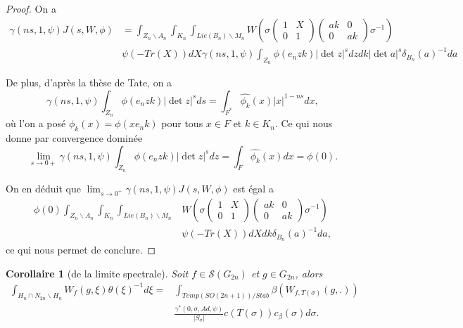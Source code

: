 \documentclass{amsart}
\newtheorem{corollaire}{Corollaire}[section]
\begin{document}
\begin{proof}
On a
\begin{equation}
\begin{split}
\gamma(ns, 1, \psi) J(s, W, \phi) &= \int_{Z_n \backslash A_n} \int_{K_n} \int_{Lie(B_n) \backslash M_n} W\left(\sigma\begin{pmatrix}
1 & X \\
0 & 1
\end{pmatrix} \begin{pmatrix}
ak & 0 \\
0 & ak
\end{pmatrix} \sigma^{-1}\right) \\
&\psi(-Tr(X)) dX \gamma(ns, 1, \psi) \int_{Z_n}\phi(e_nzk) |\det z|^s dz dk |\det a|^s \delta_{B_n}(a)^{-1} da
\end{split}
\end{equation}

De plus, d'après la thèse de Tate, on a
\begin{equation}
\gamma(ns, 1, \psi) \int_{Z_n} \phi(e_n zk) |\det z|^s ds = \int_{F^*} \widehat{\phi_k}(x)|x|^{1-ns} dx,
\end{equation}
où l'on a posé $\phi_k(x) = \phi(xe_nk)$ pour tous $x \in F$ et $k \in K_n$. Ce qui nous donne par convergence dominée
\begin{equation}
\lim_{s \rightarrow 0+} \gamma(ns, 1, \psi)\int_{Z_n} \phi(e_nzk) |\det z|^s dz = \int_{F} \widehat{\phi_k}(x)dx = \phi(0).
\end{equation}

On en déduit que $\lim_{s \rightarrow 0^+}\gamma(ns, 1, \psi) J(s, W, \phi)$ est égal a
\begin{equation}
\begin{split}
\phi(0)\int_{Z_n \backslash A_n} \int_{K_n} \int_{Lie(B_n) \backslash M_n}
&W\left(\sigma\begin{pmatrix}
1 & X \\
0 & 1
\end{pmatrix} \begin{pmatrix}
ak & 0 \\
0 & ak
\end{pmatrix} \sigma^{-1}\right) \\
&\psi(-Tr(X)) dX  dk \delta_{B_n}(a)^{-1} da,
\end{split}
\end{equation}
ce qui nous permet de conclure.
\end{proof}

\begin{corollaire}[de la limite spectrale]
\label{corolim}
Soit $f \in \mathcal{S}(G_{2n})$ et $g \in G_{2n}$, alors
\begin{equation}
\begin{split}
\int_{H_n \cap N_{2n} \backslash H_n} W_f(g, \xi) \theta(\xi)^{-1} d\xi = &\int_{Temp(SO(2n+1))/Stab} \beta(W_{f,T(\sigma)}(g,.)) \\
&\frac{\gamma^*(0, \sigma, Ad, \psi)}{|S_\sigma|} c(T(\sigma)) c_\beta(\sigma) d\sigma.
\end{split}
\end{equation}
\end{corollaire}
\end{document}
